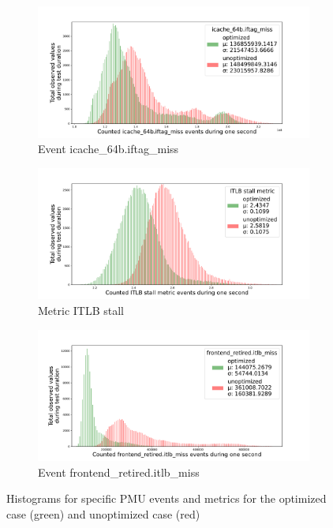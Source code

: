 \newpage
\begin{figure}[H]
    \centering
    \begin{subfigure}{\linewidth}
        \centering
        \caption{Event icache\_64b.iftag\_miss}
        \label{fig:histograms-miss}
        \includegraphics[width=.8\textwidth]{images/5_implementation/icache-iftag-miss.pdf}
        \vspace{.5\baselineskip}
    \end{subfigure}
    \begin{subfigure}{\linewidth}
        \centering
        \caption{Metric ITLB stall}
        \label{fig:histograms-stall}
        \includegraphics[width=.8\textwidth]{images/5_implementation/itlb-stall.pdf}
        \vspace{.5\baselineskip}
    \end{subfigure}
    \begin{subfigure}{\linewidth}
        \centering
        \caption{Event frontend\_retired.itlb\_miss}
        \label{fig:histograms-frontend}
        \includegraphics[width=.8\textwidth]{images/5_implementation/frontend-miss.pdf}
    \end{subfigure}
    \caption{Histograms for specific PMU events and metrics for the optimized case (green) and unoptimized case (red)}
    \label{fig:histograms}
\end{figure}
\newpage

